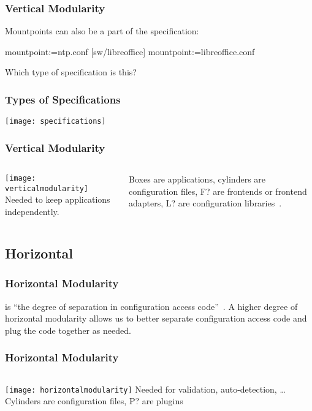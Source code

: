\begin{frame}[fragile]
	\frametitle{Vertical Modularity \cite{raab2016improving}}
	Mountpoints can also be a part of the specification:

	\begin{code}[language=Cpp,gobble=4,showspaces=no]
	[ntp]
	  mountpoint:=ntp.conf
	[sw/libreoffice]
	  mountpoint:=libreoffice.conf
	\end{code}

	\begin{task}
	Which type of specification is this?
	\end{task}
\end{frame}

\begin{frame}
	\frametitle{Types of Specifications}
	\texttt{[image: specifications]}
\end{frame}

\begin{frame}
	\frametitle{Vertical Modularity}
	\begin{columns}[c]
	\column{7cm}
	\texttt{[image: verticalmodularity]}
	\column{4cm}
	Needed to keep applications independently.

	Boxes are applications, cylinders are configuration files, F? are frontends or frontend adapters, L? are configuration libraries~\cite{raab2016improving}.
	\end{columns}
\end{frame}



\subsection{Horizontal}

\begin{frame}
	\frametitle{Horizontal Modularity \cite{raab2016improving}}

	 is ``the degree of separation in configuration access code''~\cite{raab2016improving}. 
	A higher degree of horizontal modularity allows us to better separate configuration access code and plug the code together as needed.
\end{frame}

\begin{frame}
	\frametitle{Horizontal Modularity}
	\begin{columns}[c]
	\column{7cm}
	\texttt{[image: horizontalmodularity]}
	\column{4cm}
	Needed for validation, auto-detection, \dots \\[1cm]

	Cylinders are configuration files, P? are plugins~\cite{raab2016improving}
	\end{columns}
\end{frame}




